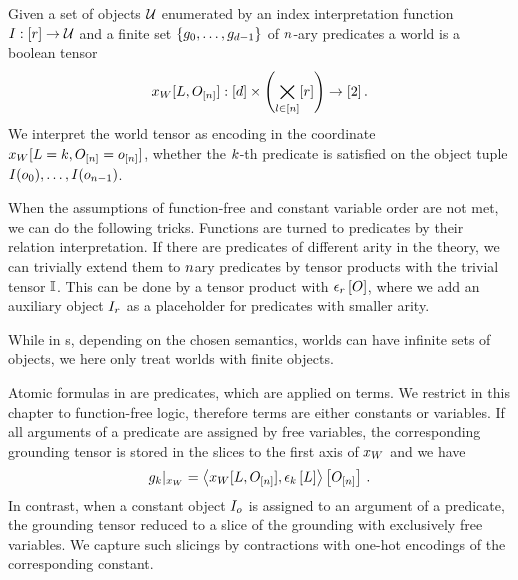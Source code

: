 \begin{definition}
    \label{def:folWorld}
    Given a set of objects $\mathcal{U}$ enumerated by an index interpretation function $I:[r]\rightarrow \mathcal{U}$ and a finite set $\{g_{0},\ldots,g_{d-1}\}$ of $n$-ary predicates a world is a boolean tensor
    \begin{align}
        \dataworldwith : [\catorder] \times \left( \symindstates\right) \rightarrow [2] \, . %
    \end{align}
    We interpret the world tensor as encoding in the coordinate $x_{W}[L=k,O_{[n]}=o_{[n]}]$, whether the $k$-th predicate is satisfied on the object tuple $I(o_{0}),\ldots,I(o_{n-1})$.
\end{definition}


When the assumptions of function-free and constant variable order are not met, we can do the following tricks.
Functions are turned to predicates by their relation interpretation.
If there are predicates of different arity in the theory, we can trivially extend them to $n$ary predicates by tensor products with the trivial tensor $\mathbb{I}$.
This can be done by a tensor product with $\epsilon_{r}\left[O\right]$, where we add an auxiliary object $I_{r}$ as a placeholder for predicates with smaller arity.

While in \firstOrderLogic{}s, depending on the chosen semantics, worlds can have infinite sets of objects, we here only treat worlds with finite objects.



Atomic formulas in \firstOrderLogic{} are predicates, which are applied on terms.
We restrict in this chapter to function-free logic, therefore terms are either constants or variables.
If all arguments of a predicate are assigned by free variables, the corresponding grounding tensor is stored in the slices to the first axis of $x_{W}$ and we have
\begin{align}
    {g_{k}}|_{x_{W}} =
    \left\langle x_{W}[L,O_{[n]}],\epsilon_{k}\left[L\right]\right\rangle \left[ O_{[n]} \right] \, .
\end{align}
In contrast, when a constant object $I_{o}$ is assigned to an argument of a predicate, the grounding tensor reduced to a slice of the grounding with exclusively free variables.
We capture such slicings by contractions with one-hot encodings of the corresponding constant.

